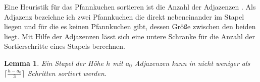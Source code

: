 \documentclass[a4paper,10pt,ngerman]{scrartcl}
\newtheorem{lemma}[theorem]{Lemma}
\begin{document}
\begin{algorithmic}
  \EndIf
  \EndIf
  \EndFor
  \EndWhile
  \EndProcedure
\end{algorithmic}
Eine Heuristik für das Pfannkuchen sortieren ist die Anzahl der Adjazenzen \cite{gates_1979}. Als Adjazenz bezeichne ich zwei
Pfannkuchen die direkt nebeneinander im Stapel liegen und für die es keinen Pfannkuchen gibt, dessen Größe zwischen den beiden liegt.
Mit Hilfe der Adjazenzen lässt sich eine untere Schranke für die Anzahl der Sortierschritte eines Stapels berechnen.
\begin{lemma}
  Ein Stapel der Höhe $h$ mit $a_0$ Adjazenzen kann in nicht weniger als $\lceil\frac{h - a_0}{3}\rceil$ Schritten sortiert werden.
\end{lemma}
\end{document}
